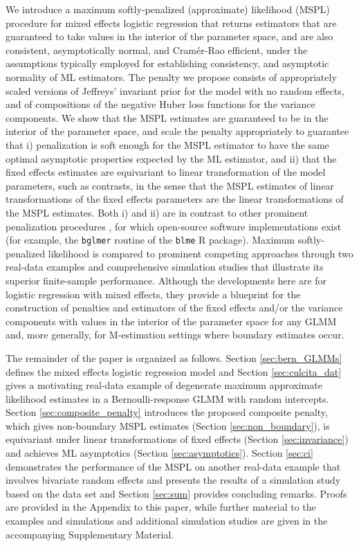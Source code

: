\documentclass[11pt, a4paper]{article}
\theoremstyle{example} \newtheorem{example}{Example}[section]
\theoremstyle{theorem} \newtheorem{theorem}{Theorem}[section]
\begin{document}
We introduce a maximum softly-penalized (approximate) likelihood
(MSPL) procedure for mixed effects logistic regression that returns
estimators that are guaranteed to take values in the interior of the
parameter space, and are also consistent, asymptotically normal, and
Cram\'{e}r-Rao efficient, under the assumptions typically employed for
establishing consistency, and asymptotic normality of ML
estimators. The penalty we propose consists of appropriately scaled
versions of Jeffreys' invariant prior for the model with no random
effects, and of compositions of the negative Huber loss functions for
the variance components. We show that the MSPL estimates are
guaranteed to be in the interior of the parameter space, and scale the
penalty appropriately to guarantee that i) penalization is soft enough
for the MSPL estimator to have the same optimal asymptotic properties
expected by the ML estimator, and ii) that the fixed effects estimates
are equivariant to linear transformation of the model parameters, such
as contrasts, in the sense that the MSPL estimates of linear
transformations of the fixed effects parameters are the linear
transformations of the MSPL estimates. Both i) and ii) are in contrast
to other prominent penalization procedures \citep[see, for
example,][]{chung+etal:2013, chung+etal:2015}, for which open-source
software implementations exist (for example, the \texttt{bglmer}
routine of the \texttt{blme} R package). Maximum softly-penalized
likelihood is compared to prominent competing approaches through two
real-data examples and comprehensive simulation studies that
illustrate its superior finite-sample performance. Although the
developments here are for logistic regression with mixed effects, they
provide a blueprint for the construction of penalties and estimators
of the fixed effects and/or the variance components with values in the
interior of the parameter space for any GLMM and, more generally, for
M-estimation settings where boundary estimates occur.

The remainder of the paper is organized as follows. Section
\ref{sec:bern_GLMMs} defines the mixed effects logistic regression
model and Section \ref{sec:culcita_dat} gives a motivating real-data
example of degenerate maximum approximate likelihood estimates in a
Bernoulli-response GLMM with random intercepts. Section
\ref{sec:composite_penalty} introduces the proposed composite penalty,
which gives non-boundary MSPL estimates (Section
\ref{sec:non_boundary}), is equivariant under linear transformations
of fixed effects (Section \ref{sec:invariance}) and achieves ML
asymptotics (Section \ref{sec:asymptotics}). Section \ref{sec:ci}
demonstrates the performance of the MSPL on another real-data example
that involves bivariate random effects and presents the results of a
simulation study based on the data set and Section \ref{sec:sum}
provides concluding remarks. Proofs are provided in the Appendix to
this paper, while further material to the examples and simulations and
additional simulation studies are given in the accompanying
Supplementary Material.
\end{document}
